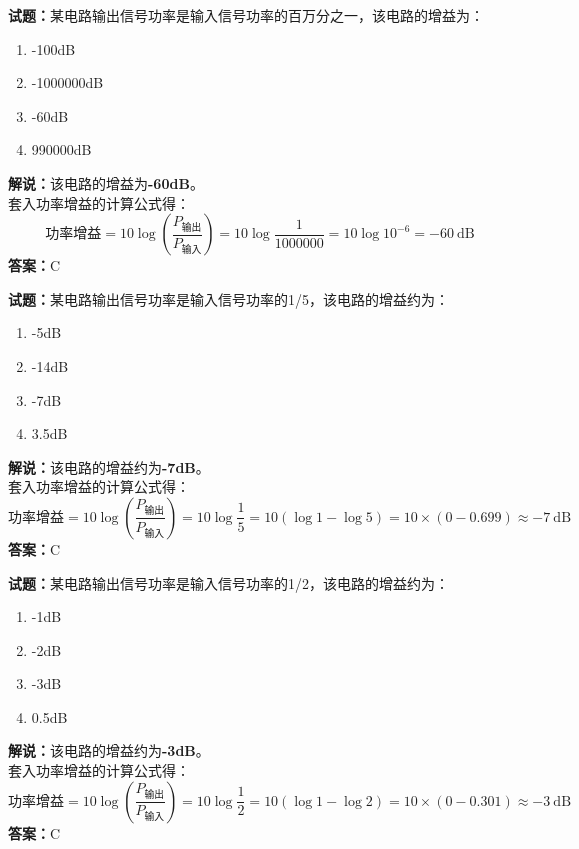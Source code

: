 \documentclass{ctexbook}
\begin{document}
\vspace{\baselineskip}

\noindent\textbf{试题：}某电路输出信号功率是输入信号功率的百万分之一，该电路的增益为：
\begin{enumerate}[leftmargin=3em]
  \item -100dB
  \item -1000000dB
  \item -60dB
  \item 990000dB
\end{enumerate}
\noindent\textbf{解说：}该电路的增益为\textbf{-60dB}。\\
套入功率增益的计算公式得：
$$\mbox{功率增益}=10 \log \left( {\frac{P_{ \mbox{输出} }}{P_{ \mbox{输入} }}} \right)=10 \log \frac{1}{1000000}=10 \log 10^{-6}=-60 \ \mathrm{dB}$$
\noindent\textbf{答案：}C

\vspace{\baselineskip}

\noindent\textbf{试题：}某电路输出信号功率是输入信号功率的1/5，该电路的增益约为：
\begin{enumerate}[leftmargin=3em]
  \item -5dB
  \item -14dB
  \item -7dB
  \item 3.5dB
\end{enumerate}
\noindent\textbf{解说：}该电路的增益约为\textbf{-7dB}。\\
套入功率增益的计算公式得：
$$\mbox{功率增益}=10 \log \left( {\frac{P_{ \mbox{输出} }}{P_{ \mbox{输入} }}} \right)=10 \log \frac{1}{5}=10 \left( \log 1 - \log 5 \right) = 10 \times \left( 0 - 0.699 \right) \approx -7 \ \mathrm{dB}$$
\noindent\textbf{答案：}C

\vspace{\baselineskip}

\noindent\textbf{试题：}某电路输出信号功率是输入信号功率的1/2，该电路的增益约为：
\begin{enumerate}[leftmargin=3em]
  \item -1dB
  \item -2dB
  \item -3dB
  \item 0.5dB
\end{enumerate}
\noindent\textbf{解说：}该电路的增益约为\textbf{-3dB}。\\
套入功率增益的计算公式得：
$$\mbox{功率增益}=10 \log \left( {\frac{P_{ \mbox{输出} }}{P_{ \mbox{输入} }}} \right)=10 \log \frac{1}{2}=10 \left( \log 1 - \log 2 \right) = 10 \times \left( 0 - 0.301 \right) \approx -3 \ \mathrm{dB}$$
\noindent\textbf{答案：}C
\end{document}

